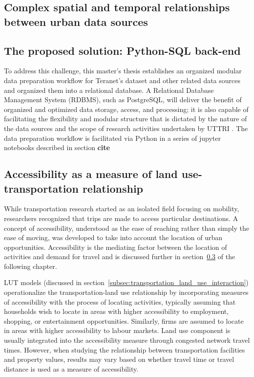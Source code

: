 \subsection{Complex spatial and temporal relationships between urban data sources} \label{subsec:complex_spatio-temporal_relationships_between_urban_data_sources}


\subsection{The proposed solution: Python-SQL back-end} \label{subsec:proposed_solution_python_sql_backend}

To address this challenge, this master's thesis establishes an organized modular data preparation workflow for Teranet's dataset and other related data sources and organized them into a relational database.
A Relational Database Management System (RDBMS), such as PostgreSQL, will deliver the benefit of organized and optimized data storage, access, and processing;
it is also capable of facilitating the flexibility and modular structure that is dictated by the nature of the data sources and the scope of research activities undertaken by UTTRI .
The data preparation workflow is facilitated via Python in a series of jupyter notebooks described in section \textbf{cite}

\subsection{Accessibility as a measure of land use-transportation relationship} \label{subsec:accessibility}

While transportation research started as an isolated field focusing on mobility, researchers recognized that trips are made to access particular destinations\cite{VanLierop2017}.
A concept of accessibility, understood as the ease of reaching rather than simply the ease of moving\cite{Preston2007}, was developed to take into account the location of urban opportunities.
Accessibility is the mediating factor between the location of activities and demand for travel and is discussed further in section~\ref{subsec:accessibility} of the following chapter.

LUT models (discussed in section~\ref{subsec:transportation_land_use_interaction}) operationalize the transportation-land use relationship by incorporating measures of accessibility with the process of locating activities, typically assuming that households wish to locate in areas with higher accessibility to employment, shopping, or entertainment opportunities.
Similarly, firms are assumed to locate in areas with higher accessibility to labour markets.
Land use component is usually integrated into the accessibility measure through congested network travel times.
However, when studying the relationship between transportation facilities and property values, results may vary based on whether travel time or travel distance is used as a measure of accessibility\cite{Sherry1999}.

